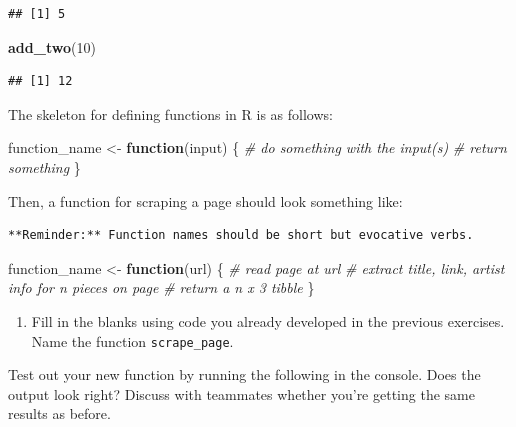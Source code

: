 \documentclass[
]{article}
\newenvironment{Shaded}{\begin{snugshade}}{\end{snugshade}}
\newcommand{\CommentTok}[1]{\textcolor[rgb]{0.56,0.35,0.01}{\textit{#1}}}
\newcommand{\ControlFlowTok}[1]{\textcolor[rgb]{0.13,0.29,0.53}{\textbf{#1}}}
\newcommand{\DecValTok}[1]{\textcolor[rgb]{0.00,0.00,0.81}{#1}}
\newcommand{\FunctionTok}[1]{\textcolor[rgb]{0.13,0.29,0.53}{\textbf{#1}}}
\newcommand{\NormalTok}[1]{#1}
\newcommand{\OtherTok}[1]{\textcolor[rgb]{0.56,0.35,0.01}{#1}}
\providecommand{\tightlist}{%
  \setlength{\itemsep}{0pt}\setlength{\parskip}{0pt}}
\begin{document}
\begin{verbatim}
## [1] 5
\end{verbatim}

\begin{Shaded}
\begin{Highlighting}[]
\FunctionTok{add\_two}\NormalTok{(}\DecValTok{10}\NormalTok{)}
\end{Highlighting}
\end{Shaded}

\begin{verbatim}
## [1] 12
\end{verbatim}

The skeleton for defining functions in R is as follows:

\begin{Shaded}
\begin{Highlighting}[]
\NormalTok{function\_name }\OtherTok{\textless{}{-}} \ControlFlowTok{function}\NormalTok{(input) \{}
  \CommentTok{\# do something with the input(s)}
  \CommentTok{\# return something}
\NormalTok{\}}
\end{Highlighting}
\end{Shaded}

Then, a function for scraping a page should look something like:

\begin{verbatim}
**Reminder:** Function names should be short but evocative verbs.
\end{verbatim}

\begin{Shaded}
\begin{Highlighting}[]
\NormalTok{function\_name }\OtherTok{\textless{}{-}} \ControlFlowTok{function}\NormalTok{(url) \{}
  \CommentTok{\# read page at url}
  \CommentTok{\# extract title, link, artist info for n pieces on page}
  \CommentTok{\# return a n x 3 tibble}
\NormalTok{\}}
\end{Highlighting}
\end{Shaded}

\begin{enumerate}
\def\labelenumi{\arabic{enumi}.}
\setcounter{enumi}{4}
\tightlist
\item
  Fill in the blanks using code you already developed in the previous
  exercises. Name the function \texttt{scrape\_page}.
\end{enumerate}

Test out your new function by running the following in the console. Does
the output look right? Discuss with teammates whether you're getting the
same results as before.
\end{document}
